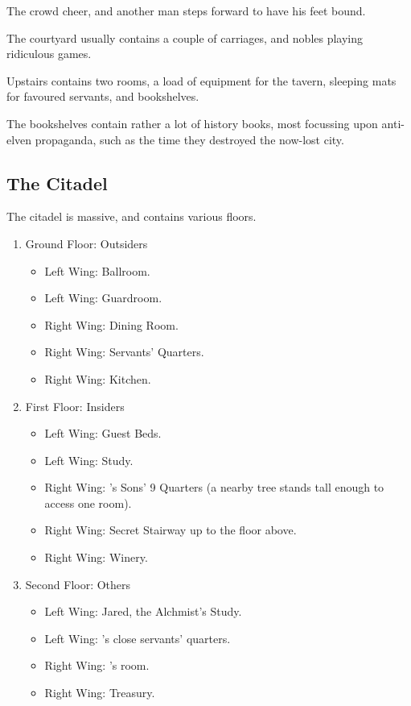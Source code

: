 \begin{multicols}{2}
\begin{boxtext}
	The crowd cheer, and another man steps forward to have his feet bound.

\end{boxtext}

The courtyard usually contains a couple of carriages, and nobles playing ridiculous games.


Upstairs contains two rooms, a load of equipment for the tavern, sleeping mats for favoured servants, and bookshelves.

The bookshelves contain rather a lot of history books, most focussing upon anti-elven propaganda, such as the time they destroyed the now-lost city.
 

\subsection{The Citadel}\label{citadel}

The citadel is massive, and contains various floors.

\begin{enumerate}

	\item{Ground Floor: Outsiders}
		\begin{itemize}
			\item{Left Wing: Ballroom.}
			\item{Left Wing: Guardroom.}
			\item{Right Wing: Dining Room.}
			\item{Right Wing: Servants' Quarters.}
			\item{Right Wing: Kitchen.}
		\end{itemize}
	\item{First Floor: Insiders}
		\begin{itemize}
			\item{Left Wing: Guest Beds.}
			\item{Left Wing: Study.}
			\item{Right Wing: 's Sons' 9 Quarters (a nearby tree stands tall enough to access one room).}
			\item{Right Wing: Secret Stairway up to the floor above.}
			\item{Right Wing: Winery.}
		\end{itemize}

	\item{Second Floor: Others}
		\begin{itemize}
			\item{Left Wing: Jared, the Alchmist's Study.}
			\item{Left Wing: 's close servants' quarters.}
			\item{Right Wing: 's room.}
			\item{Right Wing: Treasury.}
		\end{itemize}


\end{enumerate}
\end{multicols}
